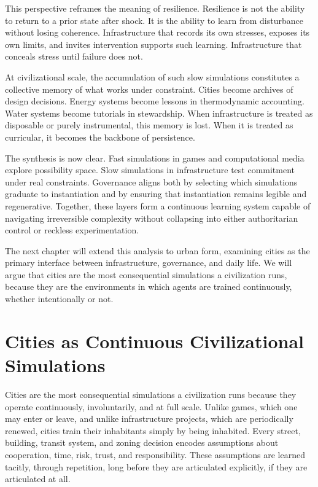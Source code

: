 \documentclass[12pt,oneside]{book}
\begin{document}
This perspective reframes the meaning of resilience. Resilience is not the ability to return to a prior state after shock. It is the ability to learn from disturbance without losing coherence. Infrastructure that records its own stresses, exposes its own limits, and invites intervention supports such learning. Infrastructure that conceals stress until failure does not.

At civilizational scale, the accumulation of such slow simulations constitutes a collective memory of what works under constraint. Cities become archives of design decisions. Energy systems become lessons in thermodynamic accounting. Water systems become tutorials in stewardship. When infrastructure is treated as disposable or purely instrumental, this memory is lost. When it is treated as curricular, it becomes the backbone of persistence.

The synthesis is now clear. Fast simulations in games and computational media explore possibility space. Slow simulations in infrastructure test commitment under real constraints. Governance aligns both by selecting which simulations graduate to instantiation and by ensuring that instantiation remains legible and regenerative. Together, these layers form a continuous learning system capable of navigating irreversible complexity without collapsing into either authoritarian control or reckless experimentation.

The next chapter will extend this analysis to urban form, examining cities as the primary interface between infrastructure, governance, and daily life. We will argue that cities are the most consequential simulations a civilization runs, because they are the environments in which agents are trained continuously, whether intentionally or not.

\chapter{Cities as Continuous Civilizational Simulations}

Cities are the most consequential simulations a civilization runs because they operate continuously, involuntarily, and at full scale. Unlike games, which one may enter or leave, and unlike infrastructure projects, which are periodically renewed, cities train their inhabitants simply by being inhabited. Every street, building, transit system, and zoning decision encodes assumptions about cooperation, time, risk, trust, and responsibility. These assumptions are learned tacitly, through repetition, long before they are articulated explicitly, if they are articulated at all.
\end{document}
